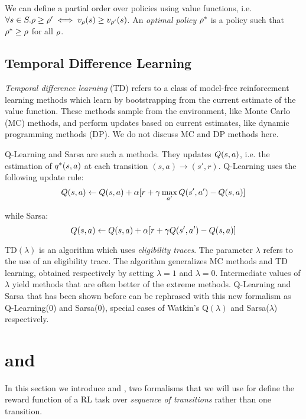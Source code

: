 We can define a partial order over policies using value functions, i.e. $\forall s\in S. \rho \ge \rho' \iff v_\rho(s) \ge v_{\rho'}(s)$. An \emph{optimal policy} $\rho^*$ is a policy such that $\rho^* \ge \rho$ for all $\rho$. 


\subsection{Temporal Difference Learning}

\emph{Temporal difference learning} (TD) refers to a class of model-free reinforcement learning methods which learn by bootstrapping from the current estimate of the value function. These methods sample from the environment, like Monte Carlo (MC) methods, and perform updates based on current estimates, like dynamic programming methods (DP). We do not discuss MC and DP methods here.

Q-Learning and Sarsa are such a methods. They updates $Q(s, a)$, i.e. the estimation of $q^*(s, a)$ at each transition $(s, a) \to (s', r)$. Q-Learning uses the following update rule:
\begin{equation}
Q(s, a) \leftarrow Q(s, a) + \alpha [r + \gamma \max_{a'} Q(s', a') - Q(s, a)]
\end{equation}

while Sarsa:
\begin{equation}
Q(s, a) \leftarrow Q(s, a) + \alpha [r + \gamma Q(s', a') - Q(s, a)]
\end{equation}

TD$(\lambda)$ is an algorithm which uses \emph{eligibility traces}. The parameter $\lambda$ refers to the use of an eligibility trace. The algorithm generalizes MC methods and TD learning, obtained respectively by setting $\lambda = 1$ and $\lambda = 0$. Intermediate values of $\lambda$ yield methods that are often better of the extreme methods. Q-Learning and Sarsa that has been shown before can be rephrased with this new formalism as Q-Learning(0) and Sarsa(0), special cases of Watkin's Q$(\lambda)$ and Sarsa($\lambda$) respectively.

\section{\LTLf and \LDLf}
In this section we introduce \LTLf and \LDLf, two formalisms that we will use for define the reward function of a RL task over \emph{sequence of transitions} rather than one transition.


